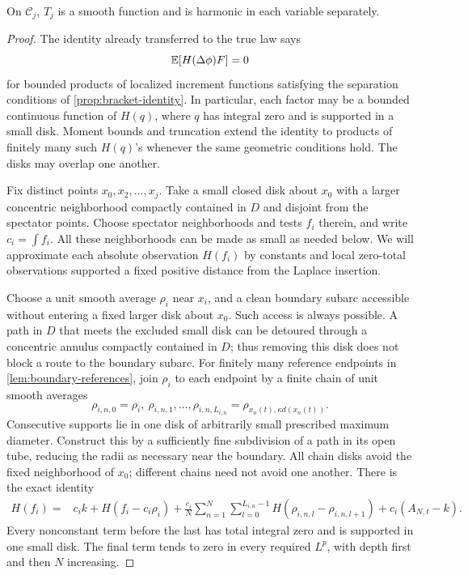 \begin{proposition}
\label{prop:moment-harmonicity}
On $\mathcal C_j$, $T_j$ is a smooth function and is harmonic in each
variable separately.
\end{proposition}

\begin{proof}
The identity already transferred to the true law says
\begin{equation}
                     \mathbb E[H(\Delta\phi)F]=0
 \label{eq:true-local-increment-identity}
\end{equation}
for bounded products of localized increment functions satisfying the
separation conditions of \cref{prop:bracket-identity}. In particular,
each factor may be a bounded continuous function of $H(q)$, where
$q$ has integral zero and is supported in a small disk. Moment bounds
and truncation extend the identity to products of finitely many such
$H(q)$'s whenever the same geometric conditions hold. The disks may
overlap one another.

Fix distinct points $x_0,x_2,\ldots,x_j$. Take a small closed disk
about $x_0$ with a larger concentric neighborhood compactly contained
in $D$ and disjoint from the spectator points. Choose spectator
neighborhoods and tests $f_i$ therein, and write $c_i=\int f_i$.
All these neighborhoods can be made as small as needed below. We
will approximate each absolute observation $H(f_i)$ by constants
and local zero-total observations supported a fixed positive distance
from the Laplace insertion.

Choose a unit smooth average $\rho_i$ near $x_i$, and a clean boundary
subarc accessible without entering a fixed larger disk about $x_0$.
Such access is always possible. A path in $D$ that meets the excluded
small disk can be detoured through a concentric annulus compactly
contained in $D$; thus removing this disk does not block a route to
the boundary subarc. For finitely many reference endpoints in
\cref{lem:boundary-references}, join $\rho_i$ to each endpoint by a
finite chain of unit smooth averages
\[
 \rho_{i,n,0}=\rho_i,\ \rho_{i,n,1},\ldots,
 \rho_{i,n,L_{i,n}}=\rho_{x_n(t),\kappa d(x_n(t))}.
\]
Consecutive supports lie in one disk of arbitrarily small prescribed
maximum diameter. Construct this by a sufficiently fine subdivision
of a path in its open tube, reducing the radii as necessary near the
boundary. All chain disks avoid the fixed neighborhood of $x_0$;
different chains need not avoid one another. There is the exact
identity
\begin{align}
 H(f_i)={}&c_i k+H(f_i-c_i\rho_i)
   +\frac{c_i}{N}\sum_{n=1}^N\sum_{l=0}^{L_{i,n}-1}
                 H(\rho_{i,n,l}-\rho_{i,n,l+1})
   +c_i(A_{N,t}-k).
 \label{eq:transport-identity}
\end{align}
Every nonconstant term before the last has total integral zero and
is supported in one small disk. The final term tends to zero in
every required $L^p$, with depth first and then $N$ increasing.


\end{proof}
